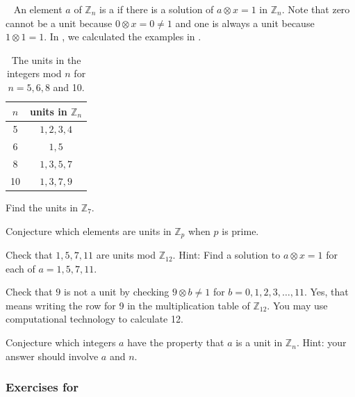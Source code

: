 \begin{exer}[\exerE] %
\label{exer_modn_units_conj}
~
    An element $a$ of $\mathbb{Z}_n$ is a  if there is a solution of $a \otimes x = 1$ in $\mathbb{Z}_n$.  Note that zero cannot be a unit because $0 \otimes x = 0 \neq 1$ and one is always a unit because $1 \otimes 1 = 1$.  In  , we calculated the examples in .

        \begin{table}[hbtp]
            \centering
            \begin{tabular}{c|c}
                $n$ & units in $\mathbb{Z}_n$ \\ \hline
                5 & $1,2,3,4$ \\ \hline
                6 & $1,5$ \\ \hline
                8 & $1,3,5,7$ \\ \hline
                10 & $1,3,7,9$ \\ 
            \end{tabular}
            \caption{The units in the integers mod $n$ for $n=5,6,8$ and 10.}
            \label{tab_units_modn}
        \end{table}

    \begin{exerpart}
        \item Find the units in $\mathbb{Z}_{7}$.  
        \item Conjecture which elements are units in $\mathbb{Z}_p$ when $p$ is prime.
        \item Check that $1, 5, 7, 11$ are units mod $\mathbb{Z}_{12}$.  Hint: Find a solution to $a \otimes x = 1$ for each of $a=1,5,7,11$.
        \item Check that $9$ is not a unit by checking $9 \otimes b \neq 1$ for $b = 0, 1, 2, 3, \ldots, 11$.  Yes, that means writing the row for 9 in the multiplication table of $\mathbb{Z}_{12}$.  You may use computational technology to calculate  12.
        \item Conjecture which integers $a$ have the property that $a$ is a unit in $\mathbb{Z}_n$. Hint: your answer should involve $a$ and $n$.
    \end{exerpart}
\end{exer}


\subsubsection*{Exercises for  \subea}

